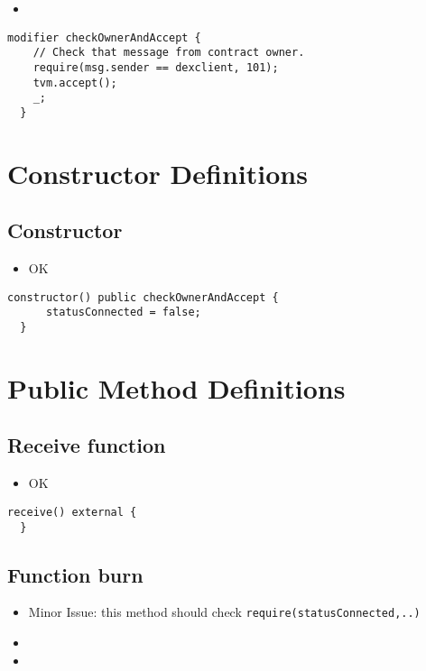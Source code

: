\begin{itemize}
\item \issueNumber{}
\end{itemize}

\begin{lstlisting}[firstnumber=32]
  modifier checkOwnerAndAccept {
    // Check that message from contract owner.
    require(msg.sender == dexclient, 101);
    tvm.accept();
    _;
  }
\end{lstlisting}

\section{Constructor Definitions}

\subsection{Constructor}

\begin{itemize}
\item OK
\end{itemize}

\begin{lstlisting}[firstnumber=39]
  constructor() public checkOwnerAndAccept {
      statusConnected = false;
  }
\end{lstlisting}

\section{Public Method Definitions}

\subsection{Receive function}

\begin{itemize}
\item OK
\end{itemize}

\begin{lstlisting}[firstnumber=129]
  receive() external {
  }
\end{lstlisting}

\subsection{Function burn}

\begin{itemize}
\item Minor Issue: this method should check {\tt require(statusConnected,..)}
\item \issueError{}
\item \issueEncodeBody{}
\end{itemize}

